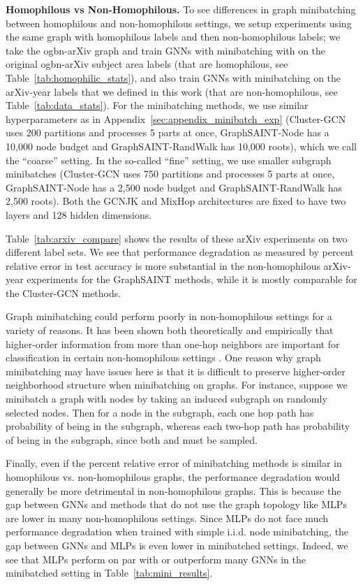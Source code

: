 \documentclass{article}
\newcommand{\myparagraph}[1]{\noindent \textbf{#1}}
\begin{document}
\myparagraph{Homophilous vs Non-Homophilous.} To see differences in graph minibatching between homophilous and non-homophilous settings, we setup experiments using the same graph with homophilous labels and then non-homophilous labels; we take the ogbn-arXiv graph and train GNNs with minibatching with on the original ogbn-arXiv subject area labels (that are homophilous, see Table~\ref{tab:homophilic_stats}), and also train GNNs with minibatching on the arXiv-year labels that we defined in this work (that are non-homophilous, see Table~\ref{tab:data_stats}). For the minibatching methods, we use similar hyperparameters as in Appendix~\ref{sec:appendix_minibatch_exp} (Cluster-GCN uses 200 partitions and processes 5 parts at once, GraphSAINT-Node has a 10,000 node budget and GraphSAINT-RandWalk has 10,000 roots), which we call the ``coarse'' setting. In the so-called ``fine'' setting, we use smaller subgraph minibatches (Cluster-GCN uses 750 partitions and processes 5 parts at once, GraphSAINT-Node has a 2,500 node budget and GraphSAINT-RandWalk has 2,500 roots). Both the GCNJK and MixHop architectures are fixed to have two layers and 128 hidden dimensions.

Table~\ref{tab:arxiv_compare} shows the results of these arXiv experiments on two different label sets. We see that performance degradation as measured by percent relative error in test accuracy is more substantial in the non-homophilous arXiv-year experiments for the GraphSAINT methods, while it is mostly comparable for the Cluster-GCN methods.

Graph minibatching could perform poorly in non-homophilous settings for a variety of reasons. 
It has been shown both theoretically and empirically that higher-order information from more than one-hop neighbors are important for classification in certain non-homophilous settings \cite{zhu2020beyond, altenburger2018monophily}. One reason why graph minibatching may have issues here is that it is difficult to preserve higher-order neighborhood structure when minibatching on graphs. For instance, suppose we minibatch a graph with  nodes by taking an induced subgraph on  randomly selected nodes. Then for a node  in the subgraph, each one hop path  has probability  of being in the subgraph, whereas each two-hop path  has probability  of being in the subgraph, since both  and  must be sampled. 


Finally, even if the percent relative error of minibatching methods is similar in homophilous vs. non-homophilous graphs, the performance degradation would generally be more detrimental in non-homophilous graphs. This is because the gap between GNNs and methods that do not use the graph topology like MLPs are lower in many non-homophilous settings. Since MLPs do not face much performance degradation when trained with simple i.i.d. node minibatching, the gap between GNNs and MLPs is even lower in minibatched settings. Indeed, we see that MLPs perform on par with or outperform many GNNs in the minibatched setting in Table~\ref{tab:mini_results}.
\end{document}
